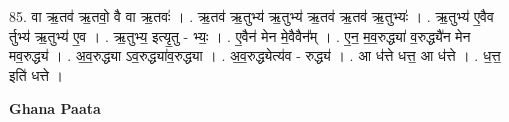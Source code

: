 \documentclass[17pt]{extarticle}
\begin{document}
85. वा ऋ॒तव॑ ऋ॒तवो॒ वै वा ऋ॒तवः॑ । . ऋ॒तव॑ ऋ॒तुभ्य॑ ऋ॒तुभ्य॑ ऋ॒तव॑ ऋ॒तव॑ ऋ॒तुभ्यः॑ । . ऋ॒तुभ्य॑ ए॒वैव र्तुभ्य॑ ऋ॒तुभ्य॑ ए॒व । . ऋ॒तुभ्य॒ इत्यृ॒तु - भ्यः॒ । . ए॒वैन॑ मेन मे॒वैवैन᳚म् । . ए॒न॒ म॒व॒रुद्ध्या॑ व॒रुद्ध्यै॑न मेन मव॒रुद्ध्य॑ । . अ॒व॒रुद्ध्या ऽव॒रुद्ध्या॑व॒रुद्ध्या । . अ॒व॒रुद्ध्येत्य॑व - रुद्ध्य॑ । . आ ध॑त्ते धत्त॒ आ ध॑त्ते । . ध॒त्त॒ इति॑ धत्ते । \newline

\textbf{Ghana Paata } \newline
\end{document}
